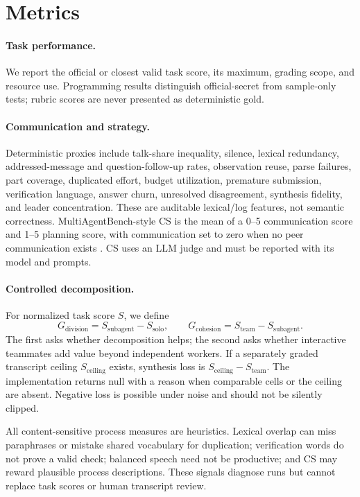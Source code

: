 \section{Metrics}
\paragraph{Task performance.}
We report the official or closest valid task score, its maximum, grading
scope, and resource use. Programming results distinguish official-secret from
sample-only tests; rubric scores are never presented as deterministic gold.

\paragraph{Communication and strategy.}
Deterministic proxies include talk-share inequality, silence, lexical
redundancy, addressed-message and question-follow-up rates, observation reuse,
parse failures, part coverage, duplicated effort, budget utilization,
premature submission, verification language, answer churn, unresolved
disagreement, synthesis fidelity, and leader concentration. These are
auditable lexical/log features, not semantic correctness. MultiAgentBench-style
CS is the mean of a 0--5 communication score and 1--5 planning score, with
communication set to zero when no peer communication exists
\cite{zhu2025multiagentbench}. CS uses an LLM judge and must be reported with
its model and prompts.

\paragraph{Controlled decomposition.}
For normalized task score $S$, we define
\[
G_{\mathrm{division}}=S_{\mathrm{subagent}}-S_{\mathrm{solo}},\qquad
G_{\mathrm{cohesion}}=S_{\mathrm{team}}-S_{\mathrm{subagent}}.
\]
The first asks whether decomposition helps; the second asks whether
interactive teammates add value beyond independent workers. If a separately
graded transcript ceiling $S_{\mathrm{ceiling}}$ exists, synthesis loss is
$S_{\mathrm{ceiling}}-S_{\mathrm{team}}$. The implementation returns null
with a reason when comparable cells or the ceiling are absent. Negative loss
is possible under noise and should not be silently clipped.

All content-sensitive process measures are heuristics. Lexical overlap can
miss paraphrases or mistake shared vocabulary for duplication; verification
words do not prove a valid check; balanced speech need not be productive; and
CS may reward plausible process descriptions. These signals diagnose runs but
cannot replace task scores or human transcript review.
